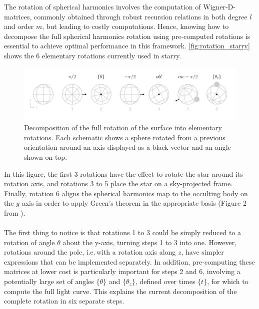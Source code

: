 \documentclass[modern]{aastex631}
\begin{document}
The rotation of spherical harmonics involves the computation of Wigner-D-matrices, commonly obtained through robust recursion relations in both degree $l$ and order $m$, but leading to costly computations. Hence, knowing how to decompose the full spherical harmonics rotation using pre-computed rotations is essential to achieve optimal performance in this framework. \autoref{fig:rotation_starry} shows the 6 elementary rotations currently used in \textsf{starry}.
\begin{figure}[H]
    \begin{center}
        \includegraphics[width=\textwidth]{../workflows/geometry/figures/rotation_starry.pdf}
        \caption{Decomposition of the full rotation of the surface into elementary rotations. Each schematic shows a sphere rotated from a previous orientation around an axis displayed as a black vector and an angle shown on top. }
        \label{fig:rotation_starry}
    \end{center}
\end{figure}
In this figure, the first 3 rotations have the effect to rotate the star around its rotation axis, and rotations 3 to 5 place the star on a sky-projected frame. Finally, rotation 6 aligns the spherical harmonics map to the occulting body on the $y$ axis in order to apply Green's theorem in the appropriate basis (Figure 2 from \citealt{starry}).\\\\
The first thing to notice is that rotations 1 to 3 could be simply reduced to a rotation of angle $\theta$ about the y-axis, turning steps 1 to 3 into one. However, rotations around the pole, i.e.\,with a rotation axis along $z$, have simpler expressions that can be implemented separately. In addition, pre-computing these matrices at lower cost is particularly important for steps 2 and 6, involving a potentially large set of angles $\{\theta\}$ and $\{\theta_z\}$, defined over times $\{t\}$, for which to compute the full light curve. This explains the current decomposition of the complete rotation in six separate steps.\\\\
\end{document}
